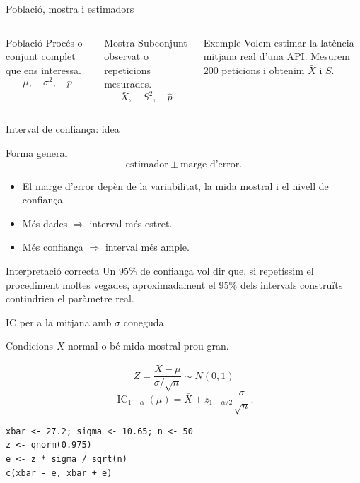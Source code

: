 \documentclass[10pt,aspectratio=169]{beamer}
\newcommand{\IC}{\operatorname{IC}}
\begin{document}
\begin{frame}[fragile]{Població, mostra i estimadors}
\begin{columns}[T]
\begin{block}{Població}
Procés o conjunt complet que ens interessa.
\[
\mu,\quad \sigma^2,\quad p
\]
\end{block}
\begin{block}{Mostra}
Subconjunt observat o repeticions mesurades.
\[
\bar X,\quad S^2,\quad \hat p
\]
\end{block}
\begin{alertblock}{Exemple}
Volem estimar la latència mitjana real d'una API. Mesurem 200 peticions i obtenim $\bar X$ i $S$.
\end{alertblock}
\end{columns}
\end{frame}

\begin{frame}[fragile]{Interval de confiança: idea}
\begin{block}{Forma general}
\[
\text{estimador} \pm \text{marge d'error}.
\]
\end{block}
\begin{itemize}
  \item El marge d'error depèn de la variabilitat, la mida mostral i el nivell de confiança.
  \item Més dades $\Rightarrow$ interval més estret.
  \item Més confiança $\Rightarrow$ interval més ample.
\end{itemize}
\begin{alertblock}{Interpretació correcta}
Un 95\% de confiança vol dir que, si repetíssim el procediment moltes vegades, aproximadament el 95\% dels intervals construïts contindrien el paràmetre real.
\end{alertblock}
\end{frame}

\begin{frame}[fragile]{IC per a la mitjana amb $\sigma$ coneguda}
\begin{block}{Condicions}
$X$ normal o bé mida mostral prou gran.
\end{block}
\[
Z=\frac{\bar X-\mu}{\sigma/\sqrt n}\sim N(0,1)
\]
\[
\IC_{1-\alpha}(\mu)=
\bar X\pm z_{1-\alpha/2}\frac{\sigma}{\sqrt n}.
\]
\begin{lstlisting}
xbar <- 27.2; sigma <- 10.65; n <- 50
z <- qnorm(0.975)
e <- z * sigma / sqrt(n)
c(xbar - e, xbar + e)
\end{lstlisting}
\end{frame}
\end{document}
